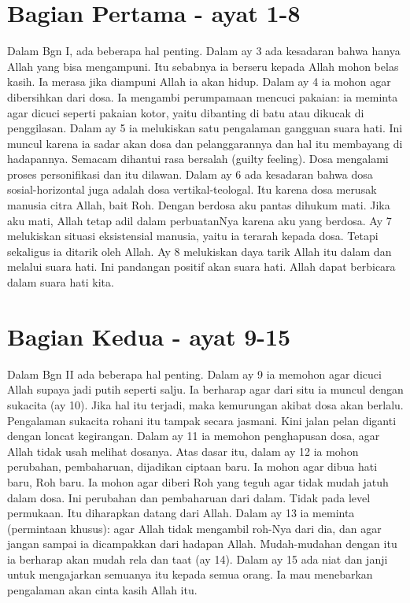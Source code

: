 \documentclass[a4paper]{article}
\begin{document}
\section*{Bagian Pertama - ayat 1-8}
Dalam Bgn I, ada beberapa hal penting. Dalam ay 3 ada kesadaran bahwa hanya Allah yang bisa mengampuni. Itu sebabnya ia berseru kepada Allah mohon belas kasih. Ia merasa jika diampuni Allah ia akan hidup. Dalam ay 4 ia mohon agar dibersihkan dari dosa. Ia mengambi perumpamaan mencuci pakaian: ia meminta agar dicuci seperti pakaian kotor, yaitu dibanting di batu atau dikucak di penggilasan. Dalam ay 5 ia melukiskan satu pengalaman gangguan suara hati. Ini muncul karena ia sadar akan dosa dan pelanggarannya dan hal itu membayang di hadapannya. Semacam dihantui rasa bersalah (guilty feeling). Dosa mengalami proses personifikasi dan itu dilawan. Dalam ay 6 ada kesadaran bahwa dosa sosial-horizontal juga adalah dosa vertikal-teologal. Itu karena dosa merusak manusia citra Allah, bait Roh. Dengan berdosa aku pantas dihukum mati. Jika aku mati, Allah tetap adil dalam perbuatanNya karena aku yang berdosa. Ay 7 melukiskan situasi eksistensial manusia, yaitu ia terarah kepada dosa. Tetapi sekaligus ia ditarik oleh Allah. Ay 8 melukiskan daya tarik Allah itu dalam dan melalui suara hati. Ini pandangan positif akan suara hati. Allah dapat berbicara dalam suara hati kita. 


\section*{Bagian Kedua - ayat 9-15}
Dalam Bgn II ada beberapa hal penting. Dalam ay 9 ia memohon agar dicuci Allah supaya jadi putih seperti salju. Ia berharap agar dari situ ia muncul dengan sukacita (ay 10). Jika hal itu terjadi, maka kemurungan akibat dosa akan berlalu. Pengalaman sukacita rohani itu tampak secara jasmani. Kini jalan pelan diganti dengan loncat kegirangan. Dalam ay 11 ia memohon penghapusan dosa, agar Allah tidak usah melihat dosanya. Atas dasar itu, dalam ay 12 ia mohon perubahan, pembaharuan, dijadikan ciptaan baru. Ia mohon agar dibua hati baru, Roh baru. Ia mohon agar diberi Roh yang teguh agar tidak mudah jatuh dalam dosa. Ini perubahan dan pembaharuan dari dalam. Tidak pada level permukaan. Itu diharapkan datang dari Allah. Dalam ay 13 ia meminta (permintaan khusus): agar Allah tidak mengambil roh-Nya dari dia, dan agar jangan sampai ia dicampakkan dari hadapan Allah. Mudah-mudahan dengan itu ia berharap akan mudah rela dan taat (ay 14). Dalam ay 15 ada niat dan janji untuk mengajarkan semuanya itu kepada semua orang. Ia mau menebarkan pengalaman akan cinta kasih Allah itu. 
\end{document}
